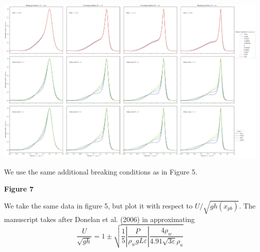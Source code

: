 \documentclass[10pt,a4paper]{article}
\begin{document}
\includegraphics[scale=0.2]{Fig6.png}

We use the same additional breaking conditions as in Figure 5.
\pagebreak


{\bf\huge Figure 7}

We take the same data in figure 5, but plot it with respect to $U/\sqrt{gh(x_{pb})}$. The manuscript takes after Donelan et al. (2006) in approximating
$$\frac{U}{\sqrt{gh}} = 1 \pm \sqrt{\frac15 \left|\frac{P}{\rho_wgL\varepsilon}\right|\frac{4\rho_w}{4.91\sqrt{3\varepsilon} \rho_a}}$$
\end{document}
